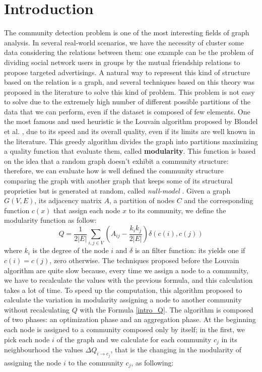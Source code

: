 \section{Introduction}
The community detection problem is one of the most interesting fields of graph analysis. In several real-world scenarios, we have the necessity of cluster some data considering the relations between them: one example can be the problem of dividing social network users in groups by the mutual friendship relations to propose targeted advertisings. A natural way to represent this kind of structure based on the relation is a graph, and several techniques based on this theory was proposed in the literature to solve this kind of problem. This problem is not easy to solve due to the extremely high number of different possible partitions of the data that we can perform, even if the dataset is composed of few elements.
One the most famous and used heuristic is the Louvain algorithm proposed by Blondel et al. \cite{Blondel_2008}, due to its speed and its overall quality, even if its limits are well known in the literature. This greedy algorithm divides the graph into partitions maximizing a quality function that evaluate them, called \textbf{modularity}. This function is based on the idea that a random graph doesn't exhibit a community structure: therefore, we can evaluate how is well defined the community structure comparing the graph with another graph that keeps some of its structural proprieties but is generated at random, called \textit{null-model} \cite{Girvan2002Community}. Given a graph $G(V,E)$, its adjacency matrix $A$, a partition of nodes $C$ and the corresponding function $c(x)$ that assign each node $x$ to its community, we define the modularity function as follow:
\begin{equation}\label{intro_Q}
Q = \frac{1}{2|E|} \sum_{i,j \in V}\left(A_{ij} - \frac{k_ik_j}{2|E|}\right) \delta(c(i), c(j))
\end{equation}
where $k_i$ is the degree of the node $i$ and $\delta$ is an filter function: its yields one if $c(i) = c(j)$, zero otherwise.
The techniques proposed before the Louvain algorithm are quite slow because, every time we assign a node to a community, we have to recalculate the values with the previous formula, and this calculation takes a lot of time. To speed up the computation, this algorithm proposed to calculate the variation in modularity assigning a node to another community without recalculating $Q$ with the Formula \ref{intro_Q}. The algorithm is composed of two phases: an optimization phase and an aggregation phase. At the beginning each node is assigned to a community composed only by itself; in the first, we pick each node $i$ of the graph and we calculate for each community $c_j$ in its neighbourhood the values $\Delta Q_{i \rightarrow c_j}$, that is the changing in the modularity of assigning the node $i$ to the community $c_j$, as following:
